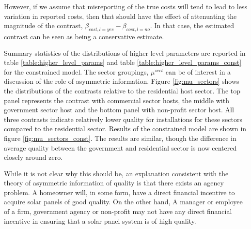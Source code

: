 \documentclass[a4paper]{article}
\begin{document}
However, if we assume that misreporting of the true costs will tend to lead to less variation in reported costs, then that should have the effect of attenuating the magnitude of the contrast, $\beta_{cost, l=yes} - \beta_{cost, l=no}$. In that case, the estimated contrast can be seen as being a conservative estimate.

Summary statistics of the distributions of higher level parameters are reported in table \ref{table:higher_level_params} and table \ref{table:higher_level_params_const} for the constrained model. The sector groupings, $\mu^{sect}$ can be of interest in a discussion of the role of asymmetric information. Figure \ref{fig:mu_sectors} shows the distributions of the contrasts relative to the residential host sector. The top panel represents the contrast with commercial sector hosts, the middle with government sector host and the bottom panel with non-profit sector host. All three contrasts indicate relatively lower quality for installations for these sectors compared to the residential sector. Results of the constrained model are shown in figure \ref{fig:mu_sectors_const}. The results are similar, though the difference in average quality between the government and residential sector is now centered closely around zero.

While it is not clear why this should be, an explanation consistent with the theory of asymmetric information of quality is that there exists an agency problem. A homeowner will, in some form, have a direct financial incentive to acquire solar panels of good quality. On the other hand, A manager or employee of a firm, government agency or non-profit may not have any direct financial incentive in ensuring that a solar panel system is of high quality.
\end{document}
